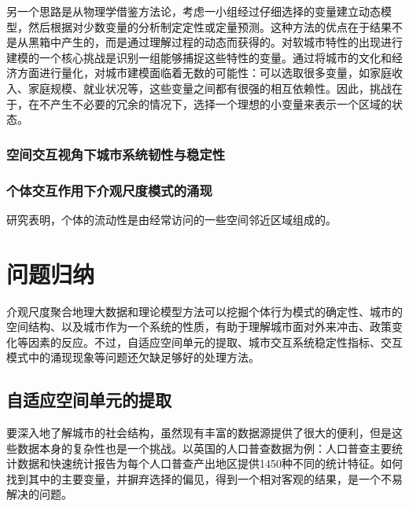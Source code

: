 另一个思路是从物理学借鉴方法论，考虑一小组经过仔细选择的变量建立动态模型，然后根据对少数变量的分析制定定性或定量预测。这种方法的优点在于结果不是从黑箱中产生的，而是通过理解过程的动态而获得的。对软城市特性的出现进行建模的一个核心挑战是识别一组能够捕捉这些特性的变量。通过将城市的文化和经济方面进行量化，对城市建模面临着无数的可能性：可以选取很多变量，如家庭收入、家庭规模、就业状况等，这些变量之间都有很强的相互依赖性。因此，挑战在于，在不产生不必要的冗余的情况下，选择一个理想的小变量来表示一个区域的状态。




\subsubsection{空间交互视角下城市系统韧性与稳定性}



\subsubsection{个体交互作用下介观尺度模式的涌现}



研究表明，个体的流动性是由经常访问的一些空间邻近区域组成的。


\section{问题归纳}

介观尺度聚合地理大数据和理论模型方法可以挖掘个体行为模式的确定性、城市的空间结构、以及城市作为一个系统的性质，有助于理解城市面对外来冲击、政策变化等因素的反应。不过，自适应空间单元的提取、城市交互系统稳定性指标、交互模式中的涌现现象等问题还欠缺足够好的处理方法。

\subsection{自适应空间单元的提取}

要深入地了解城市的社会结构，虽然现有丰富的数据源提供了很大的便利，但是这些数据本身的复杂性也是一个挑战。以英国的人口普查数据为例：人口普查主要统计数据和快速统计报告为每个人口普查产出地区提供1450种不同的统计特征。如何找到其中的主要变量，并摒弃选择的偏见，得到一个相对客观的结果，是一个不易解决的问题。